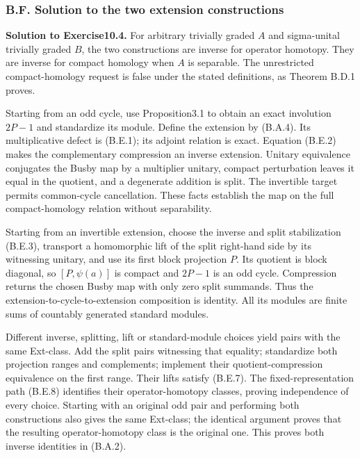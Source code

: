 \documentclass[
  11pt,
]{article}
\begin{document}
\subsubsection{B.F. Solution to the two extension
constructions}\label{b.f.-solution-to-the-two-extension-constructions}

\textbf{Solution to Exercise10.4.} For arbitrary trivially graded \(A\)
and sigma-unital trivially graded \(B\), the two constructions are
inverse for operator homotopy. They are inverse for compact homology
when \(A\) is separable. The unrestricted compact-homology request is
false under the stated definitions, as Theorem B.D.1 proves.

Starting from an odd cycle, use Proposition3.1 to obtain an exact
involution \(2P-1\) and standardize its module. Define the extension by
(B.A.4). Its multiplicative defect is (B.E.1); its adjoint relation is
exact. Equation (B.E.2) makes the complementary compression an inverse
extension. Unitary equivalence conjugates the Busby map by a multiplier
unitary, compact perturbation leaves it equal in the quotient, and a
degenerate addition is split. The invertible target permits common-cycle
cancellation. These facts establish the map on the full compact-homology
relation without separability.

Starting from an invertible extension, choose the inverse and split
stabilization (B.E.3), transport a homomorphic lift of the split
right-hand side by its witnessing unitary, and use its first block
projection \(P\). Its quotient is block diagonal, so \([P,\psi(a)]\) is
compact and \(2P-1\) is an odd cycle. Compression returns the chosen
Busby map with only zero split summands. Thus the
extension-to-cycle-to-extension composition is identity. All its modules
are finite sums of countably generated standard modules.

Different inverse, splitting, lift or standard-module choices yield
pairs with the same Ext-class. Add the split pairs witnessing that
equality; standardize both projection ranges and complements; implement
their quotient-compression equivalence on the first range. Their lifts
satisfy (B.E.7). The fixed-representation path (B.E.8) identifies their
operator-homotopy classes, proving independence of every choice.
Starting with an original odd pair and performing both constructions
also gives the same Ext-class; the identical argument proves that the
resulting operator-homotopy class is the original one. This proves both
inverse identities in (B.A.2).
\end{document}
